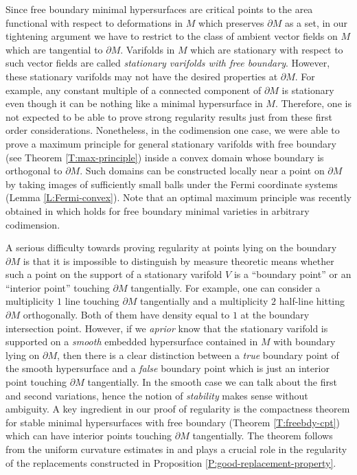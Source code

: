 \documentclass[10pt]{amsart}
\theoremstyle{definition}
\theoremstyle{remark}
\numberwithin{equation}{section}
\begin{document}
Since free boundary minimal hypersurfaces are critical points to the area functional with respect to deformations in $M$ which preserves $\partial M$ as a set, in our tightening argument we have to restrict to the class of ambient vector fields on $M$ which are tangential to $\partial M$. Varifolds in $M$ which are stationary with respect to such vector fields are called {\em stationary varifolds with free boundary}. However, these stationary varifolds may not have the desired properties at $\partial M$. For example, any constant multiple of a connected component of $\partial M$ is stationary even though it can be nothing like a minimal hypersurface in $M$. Therefore, one is not expected to be able to prove strong regularity results just from these first order considerations. Nonetheless, in the codimension one case, we were able to prove a maximum principle for general stationary varifolds with free boundary (see Theorem \ref{T:max-principle}) inside a convex domain whose boundary is orthogonal to $\partial M$. Such domains can be constructed locally near a point on $\partial M$ by taking images of sufficiently small balls under the Fermi coordinate systems (Lemma \ref{L:Fermi-convex}). Note that an optimal maximum principle was recently obtained in \cite{max-principle} which holds for free boundary minimal varieties in arbitrary codimension.

A serious difficulty towards proving regularity at points lying on the boundary $\partial M$ is that it is impossible to distinguish by measure theoretic means whether such a point on the support of a stationary varifold $V$ is a ``boundary point'' or an ``interior point'' touching $\partial M$ tangentially. For example, one can consider a multiplicity $1$ line touching $\partial M$ tangentially and a multiplicity $2$ half-line hitting $\partial M$ orthogonally. Both of them have density equal to $1$ at the boundary intersection point. However, if we \emph{aprior} know that the stationary varifold is supported on a \emph{smooth} embedded hypersurface contained in $M$ with boundary lying on $\partial M$, then there is a clear distinction between a \emph{true} boundary point of the smooth hypersurface and a \emph{false} boundary point which is just an interior point touching $\partial M$ tangentially. In the smooth case we can talk about the first and second variations, hence the notion of \emph{stability} makes sense without ambiguity. A key ingredient in our proof of regularity is the compactness theorem for stable minimal hypersurfaces with free boundary (Theorem \ref{T:freebdy-cpt}) which can have interior points touching $\partial M$ tangentially. The theorem follows from the uniform curvature estimates in \cite{Li-Zhou-A} and plays a crucial role in the regularity of the replacements constructed in Proposition \ref{P:good-replacement-property}.
\end{document}
